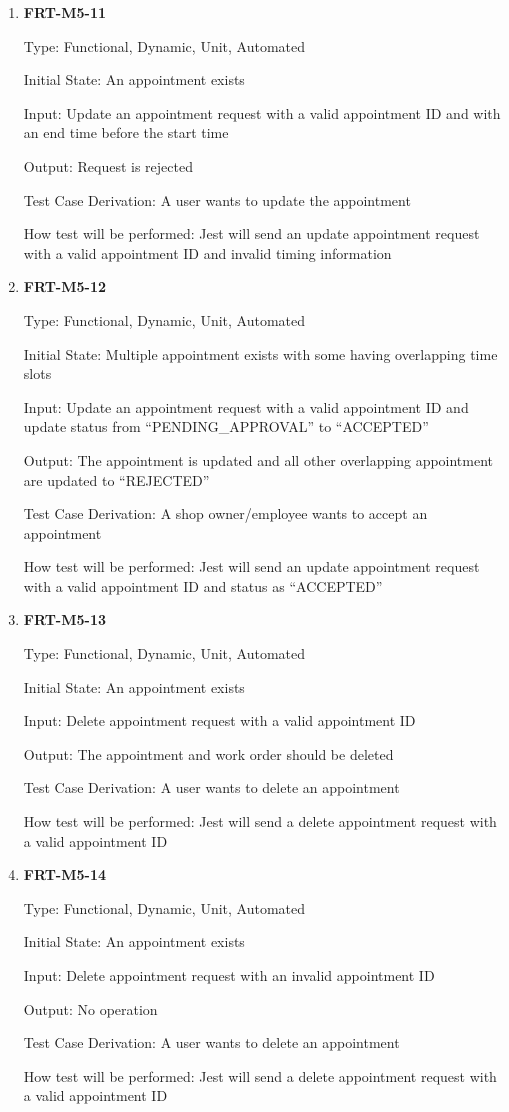 \documentclass[12pt, titlepage]{article}
\begin{document}
\begin{enumerate}
	\item \textbf{FRT-M5-11}

	      Type: Functional, Dynamic, Unit, Automated

	      Initial State: An appointment exists

	      Input: Update an appointment request with a valid appointment ID and with an end time before the
	      start time

	      Output: Request is rejected

	      Test Case Derivation: A user wants to update the appointment

	      How test will be performed: Jest will send an update appointment request with a valid appointment
	      ID and invalid timing information

	\item \textbf{FRT-M5-12}

	      Type: Functional, Dynamic, Unit, Automated

	      Initial State: Multiple appointment exists with some having overlapping time slots

	      Input: Update an appointment request with a valid appointment ID and update status from
	      ``PENDING\_APPROVAL'' to ``ACCEPTED''

	      Output: The appointment is updated and all other overlapping appointment are updated to
	      ``REJECTED''

	      Test Case Derivation: A shop owner/employee wants to accept an appointment

	      How test will be performed: Jest will send an update appointment request with a valid appointment
	      ID and status as ``ACCEPTED''

	\item \textbf{FRT-M5-13}

	      Type: Functional, Dynamic, Unit, Automated

	      Initial State: An appointment exists

	      Input: Delete appointment request with a valid appointment ID

	      Output: The appointment and work order should be deleted

	      Test Case Derivation: A user wants to delete an appointment

	      How test will be performed: Jest will send a delete appointment request with a valid appointment ID

	\item \textbf{FRT-M5-14}

	      Type: Functional, Dynamic, Unit, Automated

	      Initial State: An appointment exists

	      Input: Delete appointment request with an invalid appointment ID

	      Output: No operation

	      Test Case Derivation: A user wants to delete an appointment

	      How test will be performed: Jest will send a delete appointment request with a valid appointment ID

\end{enumerate}
\end{document}
